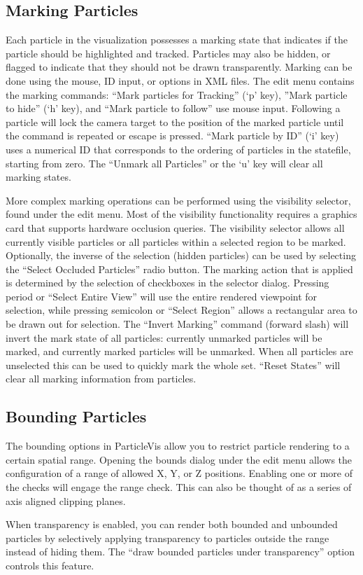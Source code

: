 \subsection{Marking Particles}

	Each particle in the visualization possesses a marking state that indicates if the particle should be highlighted and tracked.  Particles may also be hidden, or flagged to indicate that they should not be drawn transparently.  Marking can be done using the mouse, ID input, or options in XML files.  The edit menu contains the marking commands: ``Mark particles for Tracking'' (`p' key), ''Mark particle to hide'' (`h' key), and ``Mark particle to follow'' use mouse input.  Following a particle will lock the camera target to the position of the marked particle until the command is repeated or escape is pressed.   ``Mark particle by ID'' (`i' key) uses a numerical ID that corresponds to the ordering of particles in the statefile, starting from zero.  The ``Unmark all Particles'' or the `u' key will clear all marking states.
	
	More complex marking operations can be performed using the visibility selector, found under the edit menu.  Most of the visibility functionality requires a graphics card that supports hardware occlusion queries.  The visibility selector allows all currently visible particles or all particles within a selected region to be marked.  Optionally, the inverse of the selection (hidden particles) can be used by selecting the ``Select Occluded Particles'' radio button.  The marking action that is applied is determined by the selection of checkboxes in the selector dialog.  Pressing period or ``Select Entire View'' will use the entire rendered viewpoint for selection, while pressing semicolon or ``Select Region'' allows a rectangular area to be drawn out for selection.  The ``Invert Marking'' command (forward slash) will invert the mark state of all particles: currently unmarked particles will be marked, and currently marked particles will be unmarked.  When all particles are unselected this can be used to quickly mark the whole set.  ``Reset States'' will clear all marking information from particles.

\subsection{Bounding Particles}

	The bounding options in ParticleVis allow you to restrict particle rendering to a certain spatial range.  Opening the bounds dialog under the edit menu allows the configuration of a range of allowed X, Y, or Z positions.  Enabling one or more of the checks will engage the range check.  This can also be thought of as a series of axis aligned clipping planes.  
	
	When transparency is enabled, you can render both bounded and unbounded particles by selectively applying transparency to particles outside the range instead of hiding them.  The ``draw bounded particles under transparency'' option controls this feature.